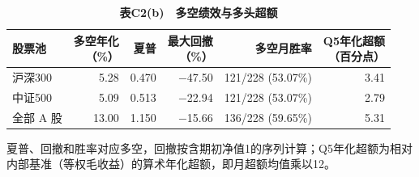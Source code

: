 \begingroup\small\setlength{\tabcolsep}{4pt}
\begin{table}[H]\centering
\caption*{\textbf{表C2(b)　多空绩效与多头超额}}
\begin{tabular*}{\textwidth}{@{\extracolsep{\fill}}lrrrrr@{}}\toprule
股票池 & \makecell{多空年化\\（\%）} & 夏普 & \makecell{最大回撤\\（\%）} & 多空月胜率 & \makecell{Q5年化超额\\（百分点）} \\ \midrule
沪深300 & 5.28 & 0.470 & $-$47.50 & 121/228 (53.07\%) & 3.41 \\
中证500 & 5.09 & 0.513 & $-$22.94 & 121/228 (53.07\%) & 2.79 \\
全部 A 股 & 13.00 & 1.150 & $-$15.66 & 136/228 (59.65\%) & 5.31 \\
\bottomrule\end{tabular*}
\par\smallskip\raggedright\footnotesize 夏普、回撤和胜率对应多空，回撤按含期初净值1的序列计算；Q5年化超额为相对内部基准（等权毛收益）的算术年化超额，即月超额均值乘以12。\end{table}
\endgroup
